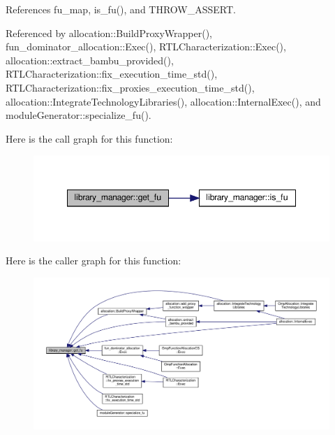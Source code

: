 References fu\+\_\+map, is\+\_\+fu(), and T\+H\+R\+O\+W\+\_\+\+A\+S\+S\+E\+RT.



Referenced by allocation\+::\+Build\+Proxy\+Wrapper(), fun\+\_\+dominator\+\_\+allocation\+::\+Exec(), R\+T\+L\+Characterization\+::\+Exec(), allocation\+::extract\+\_\+bambu\+\_\+provided(), R\+T\+L\+Characterization\+::fix\+\_\+execution\+\_\+time\+\_\+std(), R\+T\+L\+Characterization\+::fix\+\_\+proxies\+\_\+execution\+\_\+time\+\_\+std(), allocation\+::\+Integrate\+Technology\+Libraries(), allocation\+::\+Internal\+Exec(), and module\+Generator\+::specialize\+\_\+fu().

Here is the call graph for this function\+:
\nopagebreak
\begin{figure}[H]
\begin{center}
\leavevmode
\includegraphics[width=348pt]{d8/d35/classlibrary__manager_a70a66a780470a75540aee74e21a5c3bf_cgraph}
\end{center}
\end{figure}
Here is the caller graph for this function\+:
\nopagebreak
\begin{figure}[H]
\begin{center}
\leavevmode
\includegraphics[width=350pt]{d8/d35/classlibrary__manager_a70a66a780470a75540aee74e21a5c3bf_icgraph}
\end{center}
\end{figure}
\mbox{\label{classlibrary__manager_a7de047085c8a9e56751b635aeee4657e}} 
